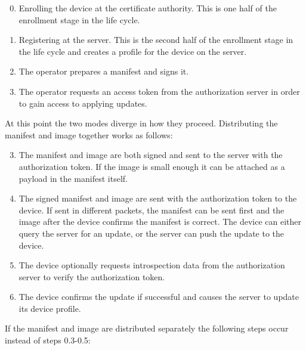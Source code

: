 \documentclass[0-thesis.tex]{subfiles}
\begin{document}
\begin{enumerate}[label=0.\arabic*]
    \setcounter{enumi}{-1}
    \item Enrolling the device at the certificate authority. This is one half of the
            enrollment stage in the life cycle.
    \item Registering at the server. This is the second half of the enrollment stage
            in the life cycle and creates a profile for the device on the server.
    \item The operator prepares a manifest and signs it.
    \item The operator requests an access token from the authorization server in order to
            gain access to applying updates.
\end{enumerate}

At this point the two modes diverge in how they proceed. Distributing the manifest and
image together works as follows:

\begin{enumerate}[label=0.\arabic*]
    \setcounter{enumi}{2}
    \item The manifest and image are both signed and sent to the server with the
            authorization token. If the image is small enough it can be attached as a
            payload in the manifest itself.
    \item The signed manifest and image are sent with the authorization token to the
            device. If sent in different packets, the manifest can be sent first and the
            image after the device confirms the manifest is correct. The device can either
            query the server for an update, or the server can push the update to the
            device.
    \item The device optionally requests introspection data from the authorization server
            to verify the authorization token.
    \item The device confirms the update if successful and causes the server to update
            its device profile.
\end{enumerate}

If the manifest and image are distributed separately the following steps occur instead of
steps 0.3-0.5:
\end{document}
